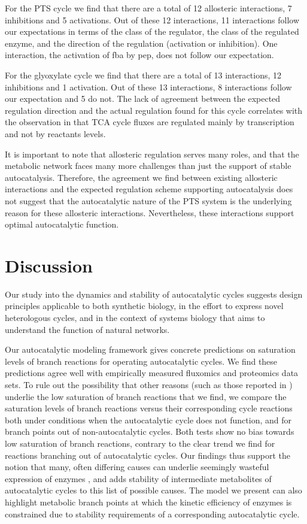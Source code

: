     For the PTS cycle we find that there are a total of 12 allosteric interactions, 7 inhibitions and 5 activations.
    Out of these 12 interactions, 11 interactions follow our expectations in terms of the class of the regulator, the class of the regulated enzyme, and the direction of the regulation (activation or inhibition).
    One interaction, the activation of fba by pep, does not follow our expectation.

    For the glyoxylate cycle we find that there are a total of 13 interactions, 12 inhibitions and 1 activation.
    Out of these 13 interactions, 8 interactions follow our expectation and 5 do not.
    The lack of agreement between the expected regulation direction and the actual regulation found for this cycle correlates with the observation in \cite{Gerosa2015-oq} that TCA cycle fluxes are regulated mainly by transcription and not by reactants levels.
 
    It is important to note that allosteric regulation serves many roles, and that the metabolic network faces many more challenges than just the support of stable autocatalysis.
    Therefore, the agreement we find between existing allosteric interactions and the expected regulation scheme supporting autocatalysis does not suggest that the autocatalytic nature of the PTS system is the underlying reason for these allosteric interactions.
    Nevertheless, these interactions support optimal autocatalytic function.
\section{Discussion}
Our study into the dynamics and stability of autocatalytic cycles suggests design principles applicable to both synthetic biology, in the effort to express novel heterologous cycles, and in the context of systems biology that aims to understand the function of natural networks.

Our autocatalytic modeling framework gives concrete predictions on saturation levels of branch reactions for operating autocatalytic cycles.
We find these predictions agree well with empirically measured fluxomics and proteomics data sets.
To rule out the possibility that other reasons (such as those reported in \cite{Staples1997-fq,Weiss1998-gp,Suarez1997-jo}) underlie the low saturation of branch reactions that we find, we compare the saturation levels of branch reactions versus their corresponding cycle reactions both under conditions when the autocatalytic cycle does not function, and for branch points out of non-autocatalytic cycles.
Both tests show no bias towards low saturation of branch reactions, contrary to the clear trend we find for reactions branching out of autocatalytic cycles.
Our findings thus support the notion that many, often differing causes can underlie seemingly wasteful expression of enzymes \cite{Salvador2003-fc, Salvador2006-yx}, and adds stability of intermediate metabolites of autocatalytic cycles to this list of possible causes.
The model we present can also highlight metabolic branch points at which the kinetic efficiency of enzymes is constrained due to stability requirements of a corresponding autocatalytic cycle.

